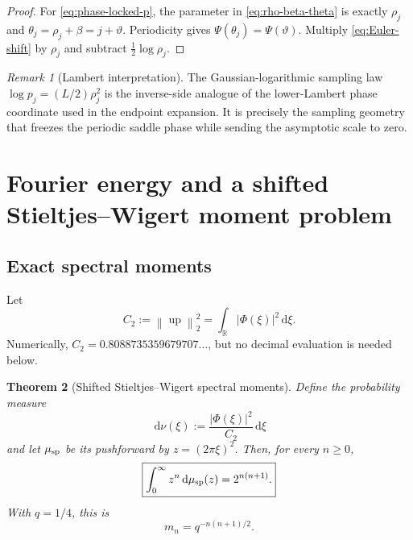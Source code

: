 \documentclass[11pt,oneside]{article}
\numberwithin{equation}{section}
\theoremstyle{plain}
\newtheorem{theorem}{Theorem}[section]
\theoremstyle{definition}
\theoremstyle{remark}
\newtheorem{remark}[theorem]{Remark}
\newcommand{\R}{\mathbb R}
\newcommand{\Up}{\operatorname{up}}
\newcommand{\dd}{\,\mathrm d}
\newcommand{\norm}[1]{\left\lVert#1\right\rVert}
\begin{document}
\begin{proof}
For \eqref{eq:phase-locked-p}, the parameter in \eqref{eq:rho-beta-theta} is exactly
$\rho_j$ and $\theta_j=\rho_j+\beta=j+\vartheta$.  Periodicity gives
$\Psi(\theta_j)=\Psi(\vartheta)$.  Multiply \eqref{eq:Euler-shift} by $\rho_j$ and subtract
$\frac12\log\rho_j$.
\end{proof}

\begin{remark}[Lambert interpretation]
The Gaussian-logarithmic sampling law $\log p_j=(L/2)\rho_j^2$ is the inverse-side analogue
of the lower-Lambert phase coordinate used in the endpoint expansion.  It is precisely the
sampling geometry that freezes the periodic saddle phase while sending the asymptotic scale
to zero.
\end{remark}

\section{Fourier energy and a shifted Stieltjes--Wigert moment problem}
\label{sec:stieltjes-wigert}

\subsection{Exact spectral moments}

Let
\begin{equation}
 C_2:=\norm{\Up}_2^2=\int_{\R}|\Phi(\xi)|^2\dd\xi.
 \label{eq:C2}
\end{equation}
Numerically, $C_2=0.8088735359679707\ldots$, but no decimal evaluation is needed below.

\begin{theorem}[Shifted Stieltjes--Wigert spectral moments]
\label{thm:spectral-moments}
Define the probability measure
\begin{equation}
 \dd\nu(\xi):=\frac{|\Phi(\xi)|^2}{C_2}\dd\xi
 \label{eq:nu-frequency}
\end{equation}
and let $\mu_{\rm sp}$ be its pushforward by
$z=(2\pi\xi)^2$.  Then, for every $n\geq0$,
\begin{equation}
 \boxed{
 \int_0^\infty z^n\dd\mu_{\rm sp}(z)
 =2^{n(n+1)}.}
 \label{eq:spectral-moment-sequence}
\end{equation}
With $q=1/4$, this is
\begin{equation}
 m_n=q^{-n(n+1)/2}.
 \label{eq:q-moments}
\end{equation}
\end{theorem}
\end{document}
